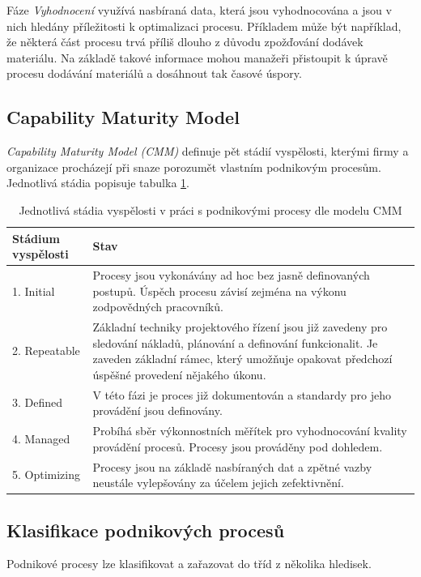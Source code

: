 Fáze \textit{Vyhodnocení} využívá nasbíraná data, která jsou vyhodnocována a jsou v nich hledány příležitosti k optimalizaci procesu. Příkladem může být například, že některá část procesu trvá příliš dlouho z důvodu zpožďování dodávek materiálu. Na základě takové informace mohou manažeři přistoupit k úpravě procesu dodávání materiálů a dosáhnout tak časové úspory.

\subsection{Capability Maturity Model}
\textit{Capability Maturity Model (CMM)} definuje pět stádií vyspělosti, kterými firmy a organizace procházejí při snaze porozumět vlastním podnikovým procesům. Jednotlivá stádia popisuje tabulka \ref{tab:cmm}.


\begin{table}
\centering
  \begin{tabular}{ | l | p{10cm} | }
    \hline
    \textbf{Stádium vyspělosti} & \textbf{Stav} \\ \hline\hline
    1. Initial & Procesy jsou vykonávány ad hoc bez jasně definovaných postupů. \newline Úspěch procesu závisí zejména na výkonu zodpovědných pracovníků. \\ \hline
    2. Repeatable & Základní techniky projektového řízení jsou již zavedeny pro sledování nákladů, plánování a definování funkcionalit. Je zaveden základní rámec, který umožňuje opakovat předchozí úspěšné provedení nějakého úkonu.  \\ \hline
    3. Defined & V této fázi je proces již dokumentován a standardy pro jeho provádění jsou definovány. \\ \hline
    4. Managed & Probíhá sběr výkonnostních měřítek pro vyhodnocování kvality provádění procesů. Procesy jsou prováděny pod dohledem.  \\ \hline
    5. Optimizing & Procesy jsou na základě nasbíraných dat a zpětné vazby neustále vylepšovány za účelem jejich zefektivnění.  \\
    \hline
  \end{tabular}
  \caption{Jednotlivá stádia vyspělosti v práci s podnikovými procesy dle modelu CMM \cite{Harmon2014}}
  \label{tab:cmm}
\end{table}

\subsection{Klasifikace podnikových procesů}
Podnikové procesy lze klasifikovat a zařazovat do tříd z několika hledisek. 

